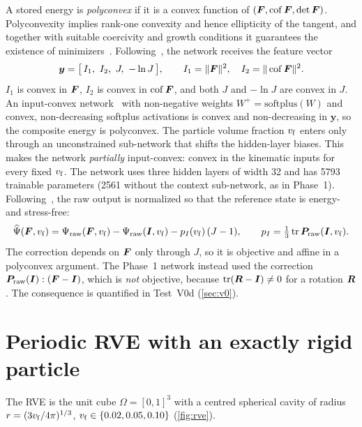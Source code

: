 A stored energy is \emph{polyconvex} if it is a convex function of
$(\bm F,\operatorname{cof}\bm F,\det\bm F)$. Polyconvexity implies rank-one convexity and
hence ellipticity of the tangent, and together with suitable coercivity and growth
conditions it guarantees the existence of minimizers~\cite{Ball1977}.
Following~\cite{Klein2022,Linden2023}, the network receives the feature vector
\begin{equation}
  \bm y=\bigl[\,I_1,\ I_2,\ J,\ -\ln J\,\bigr],\qquad
  I_1=\|\F\|^2,\quad I_2=\|\operatorname{cof}\F\|^2 .
\end{equation}
$I_1$ is convex in $\bm F$, $I_2$ is convex in $\operatorname{cof}\bm F$, and both $J$
and $-\ln J$ are convex in $J$. An input-convex network~\cite{Amos2017} with
non-negative weights $W^+=\mathrm{softplus}(W)$ and convex, non-decreasing
softplus activations is convex and non-decreasing in $\bm y$, so the composite
energy is polyconvex. The particle volume fraction $v_{\mathrm f}$ enters only through
an unconstrained sub-network that shifts the hidden-layer biases. This makes
the network \emph{partially} input-convex: convex in the kinematic inputs for
every fixed $v_{\mathrm f}$. The network uses three hidden layers of width 32 and has
5793 trainable parameters (2561 without the context sub-network, as in Phase~1). Following~\cite{Linden2023}, the raw output is normalized so that the reference
state is energy- and stress-free:
\begin{equation}
  \widehat\Psi(\bm F,v_{\mathrm f})=\Psi_{\mathrm{raw}}(\bm F,v_{\mathrm f})-\Psi_{\mathrm{raw}}(\bm I,v_{\mathrm f})
  -p_I(v_{\mathrm f})\,(J-1),\qquad
  p_I=\tfrac13\operatorname{tr}\bm P_{\mathrm{raw}}(\bm I,v_{\mathrm f}).
  \label{eq:norm}
\end{equation}
The correction depends on $\bm F$ only through $J$, so it is objective and affine in
a polyconvex argument. The Phase~1 network instead used the correction
$\bm P_{\mathrm{raw}}(\bm I):(\bm F-\bm I)$, which is \emph{not} objective,
because $\operatorname{tr}(\bm R-\bm I)\neq0$ for a rotation $\bm R$. The
consequence is quantified in Test~V0d (\cref{sec:v0}).

\section{Periodic RVE with an exactly rigid particle}

The RVE is the unit cube $\Omega=[0,1]^3$ with a centred spherical cavity of
radius $r=(3v_{\mathrm f}/4\pi)^{1/3}$, $v_{\mathrm f}\in\{0.02,0.05,0.10\}$
(\cref{fig:rve}).

